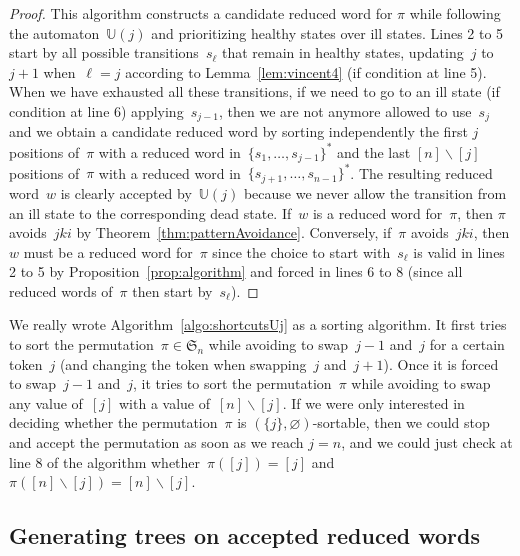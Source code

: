 \documentclass[ALCO]{cedram}
\newcommand{\fS}{\mathfrak{S}}
\newcommand{\ssm}{\smallsetminus}
\newcommand{\automatonU}{\mathbb{U}}
\begin{document}
\begin{proof}
This algorithm constructs a candidate reduced word for $\pi$ while following the automaton~$\automatonU(j)$ and prioritizing healthy states over ill states.
Lines 2 to 5 start by all possible transitions~$s_\ell$ that remain in healthy states, updating~$j$ to~$j+1$ when~$\ell = j$ according to Lemma~\ref{lem:vincent4} (if condition at line 5).
When we have exhausted all these transitions, if we need to go to an ill state (if condition at line 6) applying~$s_{j-1}$, then we are not anymore allowed to use~$s_j$ and we obtain a candidate reduced word by sorting independently the first $j$ positions of~$\pi$ with a reduced word in~$\{s_1, \dots, s_{j-1}\}^*$ and the last $[n] \ssm [j]$ positions of~$\pi$ with a reduced word in~$\{s_{j+1}, \dots, s_{n-1}\}^*$.
The resulting reduced word~$w$ is clearly accepted by~$\automatonU(j)$ because we never allow the transition from an ill state to the corresponding dead state.
If~$w$ is a reduced word for~$\pi$, then $\pi$ avoids~$jki$ by Theorem~\ref{thm:patternAvoidance}.
Conversely, if~$\pi$ avoids~$jki$, then $w$ must be a reduced word for~$\pi$ since the choice to start with~$s_\ell$ is valid in lines 2 to 5 by Proposition~\ref{prop:algorithm} and forced in lines 6 to 8 (since all reduced words of~$\pi$ then start by~$s_\ell$).
\end{proof}

\begin{remark}
We really wrote Algorithm~\ref{algo:shortcutsUj} as a sorting algorithm.
It first tries to sort the permutation~$\pi \in \fS_n$ while avoiding to swap~$j-1$ and~$j$ for a certain token~$j$ (and changing the token when swapping~$j$ and~$j+1$).
Once it is forced to swap~$j-1$ and~$j$, it tries to sort the permutation~$\pi$ while avoiding to swap any value of~$[j]$ with a value of~$[n] \ssm [j]$.
If we were only interested in deciding whether the permutation~$\pi$ is $(\{j\}, \varnothing)$-sortable, then we could stop and accept the permutation as soon as we reach $j = n$, and we could just check at line 8 of the algorithm whether~$\pi([j]) = [j]$ and~$\pi([n] \ssm [j]) = [n] \ssm [j]$.
\end{remark}

\subsection{Generating trees on accepted reduced words}\label{subsec:trees}
\end{document}

